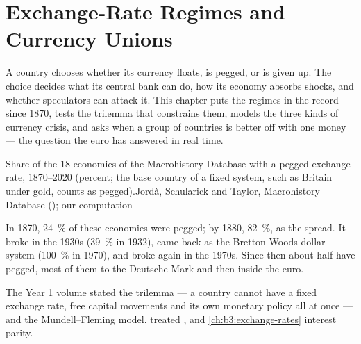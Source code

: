 \chapter{Exchange-Rate Regimes and Currency Unions}\label{ch:b3:exchange-rate-regimes}

A country chooses whether its currency floats, is pegged, or is given up. The
choice decides what its central bank can do, how its economy absorbs shocks, and
whether speculators can attack it. This chapter puts the regimes in the record
since 1870, tests the trilemma that constrains them, models the three kinds of
currency crisis, and asks when a group of countries is better off with one
money --- the question the euro has answered in real time.

\begin{openingchart}{Share of the 18 economies of the Macrohistory Database with a
pegged exchange rate, 1870--2020 (percent; the base country of a fixed system,
such as Britain under gold, counts as pegged).}{Jordà, Schularick and Taylor,
Macrohistory Database (); our computation}
\end{openingchart}

In 1870, 24~\% of these economies were pegged; by 1880, 82~\%, as the 
spread. It broke in the 1930s (39~\% in 1932), came back as the Bretton Woods dollar
system (100~\% in 1970), and broke again in the 1970s. Since then about half have
pegged, most of them to the Deutsche Mark and then inside the euro.

\begin{recall}
The Year 1 volume stated the trilemma --- a country cannot have a fixed exchange
rate, free capital movements and its own monetary policy all at once --- and the
Mundell--Fleming model.  treated , and
\cref{ch:b3:exchange-rates} interest parity.
\end{recall}

